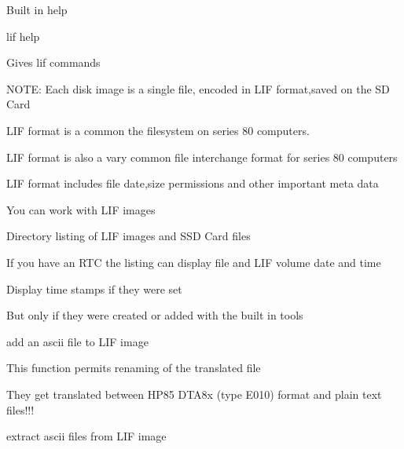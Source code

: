 \begin{DoxyItemize}
\item Built in help
\begin{DoxyItemize}
\item lif help
\begin{DoxyItemize}
\item Gives lif commands
\end{DoxyItemize}
\end{DoxyItemize}
\item N\+O\+TE\+: Each disk image is a single file, encoded in L\+IF format,saved on the SD Card
\begin{DoxyItemize}
\item L\+IF format is a common the filesystem on series 80 computers.
\item L\+IF format is also a vary common file interchange format for series 80 computers
\begin{DoxyItemize}
\item L\+IF format includes file date,size permissions and other important meta data
\end{DoxyItemize}
\end{DoxyItemize}
\item You can work with L\+IF images
\begin{DoxyItemize}
\item Directory listing of L\+IF images and S\+SD Card files
\begin{DoxyItemize}
\item If you have an R\+TC the listing can display file and L\+IF volume date and time
\begin{DoxyItemize}
\item Display time stamps if they were set
\begin{DoxyItemize}
\item But only if they were created or added with the built in tools
\end{DoxyItemize}
\end{DoxyItemize}
\end{DoxyItemize}
\item add an ascii file to L\+IF image
\begin{DoxyItemize}
\item This function permits renaming of the translated file
\item They get translated between H\+P85 D\+T\+A8x (type E010) format and plain text files!!!
\end{DoxyItemize}
\item extract ascii files from L\+IF image

\end{DoxyItemize}
\end{DoxyItemize}
